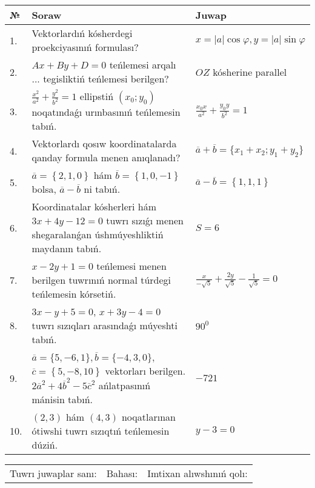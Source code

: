 \documentclass{article}
\begin{document}
\begin{tabular}{|m{0.7cm}|m{10cm}|m{4cm}|}
\hline
№ & Soraw & Juwap \\
\hline
1. & Vektorlardıń kósherdegi proekciyasınıń formulası? & $x=|a|\cos\varphi, y=|a|\sin\varphi$ \\
\hline
2. & $Ax+By+D=0$ teńlemesi arqalı ... tegisliktiń teńlemesi berilgen? & $OZ$ kósherine parallel \\
\hline
3. & $\frac{x^2}{a^2}+\frac{y^2}{b^2}=1$ ellipstiń $(x_0;y_0)$ noqatındaǵı urınbasınıń teńlemesin tabıń. & $\frac{x_0x}{a^2}+\frac{y_0y}{b^2}=1$ \\
\hline
4. & Vektorlardı qosıw koordinatalarda qanday formula menen anıqlanadı? & $\overline{a}+\overline{b}=\{x_1+x_2;y_1+y_2\}$ \\
\hline
5. & $\overline{a}=\left\{ 2, 1, 0 \right\}$ hám $\overline{b}=\left\{ 1, 0,-1 \right\}$ bolsa, $\overline{a}-\overline{b}$ ni tabıń. & $\overline{a} -\overline{b} = \left\{ 1,1,1 \right\}$ \\
\hline
6. & Koordinatalar kósherleri hám $ 3x+4y-12=0 $ tuwrı sızıǵı menen shegaralanǵan úshmúyeshliktiń maydanın tabıń. & $ S=6 $ \\
\hline
7. & $x-2y+1=0$ teńlemesi menen berilgen tuwrınıń normal túrdegi teńlemesin kórsetiń. & $\frac{x}{- \sqrt{5}}+\frac{2y}{\sqrt{5}}-\frac{1}{\sqrt{5}}=0$ \\
\hline
8. & $3x-y+5=0$, $x+3y-4=0$ tuwrı sızıqları arasındaǵı múyeshti tabıń. & $90^{0}$ \\
\hline
9. & $\overline{a}=\{5,-6, 1 \}, \overline{b}=\{-4, 3, 0 \} $, $\overline{c}=\left\{ 5,-8, 10 \right\}$ vektorları berilgen. $2{\overline{a}}^{2}+4{\overline{b}}^{2}-5{\overline{c}}^{2}$ ańlatpasınıń mánisin tabıń. & $-721$ \\
\hline
10. & $(2, 3)$ hám $(4, 3)$ noqatlarınan ótiwshi tuwrı sızıqtıń teńlemesin dúziń. & $ y-3=0$ \\
\hline
\end{tabular}

\vspace{1cm}

\begin{tabular}{lll}
Tuwrı juwaplar sanı: \underline{\hspace{1.5cm}} & 
Bahası: \underline{\hspace{1.5cm}} & 
Imtixan alıwshınıń qolı: \underline{\hspace{2cm}} \\
\end{tabular}
\end{document}
